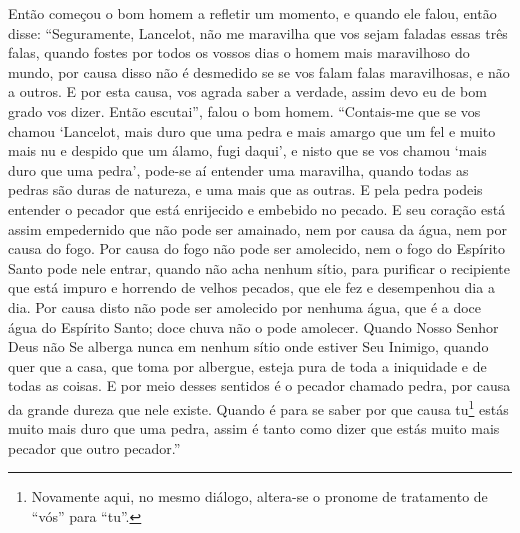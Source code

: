 Então começou o bom homem a refletir um momento, e quando ele falou, então
disse: “Seguramente, Lancelot, não me maravilha que vos sejam faladas essas
três falas, quando fostes por todos os vossos dias o homem mais maravilhoso do
mundo, por causa disso não é desmedido se se vos falam falas maravilhosas, e
não a outros. E por esta causa, vos agrada saber a verdade, assim devo eu de
bom grado vos dizer. Então escutai”, falou o bom homem. “Contais-me que se vos
chamou ‘Lancelot, mais duro que uma pedra e mais amargo que um fel e muito
mais nu e despido que um álamo, fugi daqui’, e nisto que se vos chamou ‘mais
duro que uma pedra’, pode-se aí entender uma maravilha, quando todas as pedras
são duras de natureza, e uma mais que as outras. E pela pedra podeis entender o
pecador que está enrijecido e embebido no pecado. E seu coração está assim
empedernido que não pode ser amainado, nem por causa da água, nem por causa do
fogo. Por causa do fogo não pode ser amolecido, nem o fogo do Espírito Santo
pode nele entrar, quando não acha nenhum sítio, para purificar o recipiente que
está impuro e horrendo de velhos pecados, que ele fez e desempenhou dia a dia.
Por causa disto não pode ser amolecido por nenhuma água,  que é a doce água do
Espírito Santo; doce chuva não o pode amolecer. Quando Nosso Senhor Deus não Se
alberga nunca em nenhum sítio onde estiver Seu Inimigo, quando quer que a casa,
que toma por albergue, esteja pura de toda a iniquidade e de todas as coisas. E
por meio desses sentidos é o pecador chamado pedra, por causa da grande dureza
que nele existe. Quando é para se saber por que causa tu\footnote{ Novamente
aqui, no mesmo diálogo, altera-se o pronome de tratamento de “vós”
 para “tu”.}  estás muito mais duro que
uma pedra, assim é tanto como dizer que estás muito mais pecador que outro
pecador.” 


